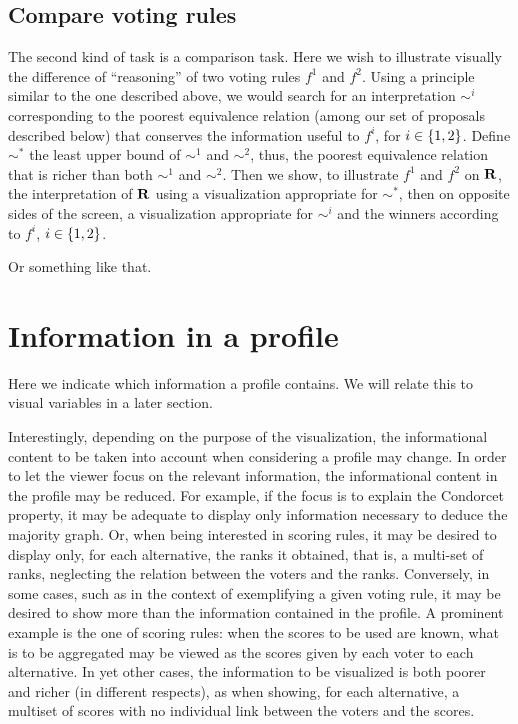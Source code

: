 \documentclass[version=last, pagesize, twoside=off, bibliography=totoc, DIV=calc, fontsize=12pt, a4paper, french, english]{scrartcl}
\begin{document}
\subsection{Compare voting rules}
The second kind of task is a comparison task.  Here we wish to illustrate visually the difference of “reasoning” of two voting rules $f^1$ and $f^2$. Using a principle similar to the one described above, we would search for an interpretation $\sim^i$ corresponding to the poorest equivalence relation (among our set of proposals described below) that conserves the information useful to $f^i$, for $i \in \left\{1, 2\right\}$. Define $\sim^*$ the least upper bound of $\sim^1$ and $\sim^2$, thus, the poorest equivalence relation that is richer than both $\sim^1$ and $\sim^2$. Then we show, to illustrate $f^1$ and $f^2$ on $\mathbf{R}$, the interpretation of $\mathbf{R}$ using a visualization appropriate for $\sim^*$, then on opposite sides of the screen, a visualization appropriate for $\sim^i$ and the winners according to $f^i$, $i \in \left\{1, 2\right\}$. 

Or something like that.

\section{Information in a profile}
Here we indicate which information a profile contains.
We will relate this to visual variables in a later section.

Interestingly, depending on the purpose of the visualization, the informational content to be taken into account when considering a profile may change. In order to let the viewer focus on the relevant information, the informational content in the profile may be reduced. For example, if the focus is to explain the Condorcet property, it may be adequate to display only information necessary to deduce the majority graph. Or, when being interested in scoring rules, it may be desired to display only, for each alternative, the ranks it obtained, that is, a multi-set of ranks, neglecting the relation between the voters and the ranks. Conversely, in some cases, such as in the context of exemplifying a given voting rule, it may be desired to show more than the information contained in the profile. A prominent example is the one of scoring rules: when the scores to be used are known, what is to be aggregated may be viewed as the scores given by each voter to each alternative. In yet other cases, the information to be visualized is both poorer and richer (in different respects), as when showing, for each alternative, a multiset of scores with no individual link between the voters and the scores.
\end{document}
